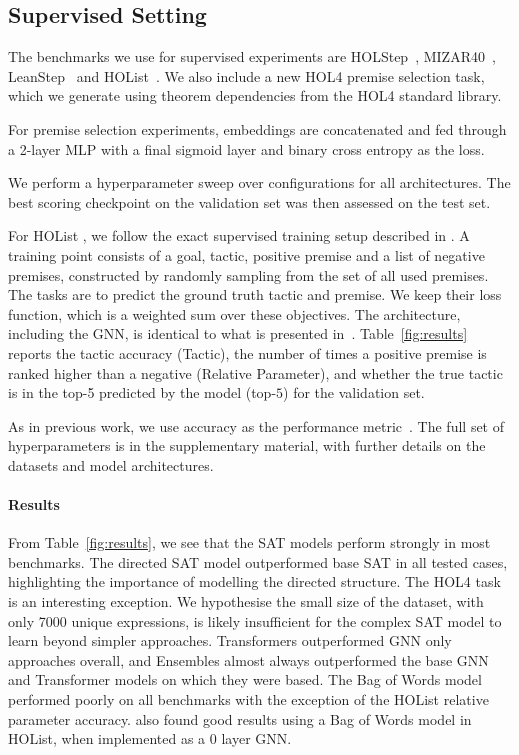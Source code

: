 \documentclass[letterpaper]{article} %
\newcommand\system[1]{#1}
\newcommand\dataset[1]{#1}
\begin{document}
    \subsection{Supervised Setting}
    The benchmarks we use for supervised experiments are HOLStep~\cite{kaliszyk_holstep_2017}, MIZAR40~\cite{kaliszyk_mizar_2015}, LeanStep~\cite{han_proof_2021} and HOList~\cite{bansal_holist_2019}. We also include a new HOL4 premise selection task, which we generate using theorem dependencies from the HOL4 standard library.

    For premise selection experiments,
    embeddings are concatenated and fed through a 2-layer MLP
    with a final sigmoid layer and binary cross entropy as the loss.

    We perform a hyperparameter sweep over configurations for all architectures. The best scoring checkpoint on the validation set was then assessed on the test set.

    For \dataset{HOList} \cite{bansal_holist_2019}, we follow the exact supervised training setup described in \cite{paliwal_graph_2020}.
    A training point consists of a goal, tactic, positive premise and a list of negative premises, constructed by randomly sampling from the set of all used premises.
    The tasks are to predict the ground truth tactic and premise.
    We keep their loss function, which is a weighted sum over these objectives.
    The architecture, including the GNN, is identical to what is presented in~\cite{paliwal_graph_2020}.
    Table~\ref{fig:results} reports the tactic accuracy (Tactic), the number of times a positive premise is ranked higher than a negative (Relative Parameter), and whether the true tactic is in the top-5 predicted by the model (top-$5$) for the validation set.

    As in previous work, we use accuracy as the performance metric~\cite{paliwal_graph_2020, wang_premise_2017}.
    The full set of hyperparameters is in the supplementary material, with further details on the datasets and model architectures.

    \paragraph{Results}
    From Table~\ref{fig:results}, we see that the SAT models perform strongly in most benchmarks. The directed SAT model outperformed base SAT in all tested cases, highlighting the importance of modelling the directed structure. The \system{HOL4} task is an interesting exception.
    We hypothesise the small size of the dataset, with only 7000 unique expressions, is likely insufficient for the complex SAT model to learn beyond simpler approaches.
    Transformers outperformed GNN only approaches overall, and Ensembles almost always outperformed the base GNN and Transformer models on which they were based.
    The Bag of Words model performed poorly on all benchmarks with the exception of the \dataset{HOList} relative parameter accuracy.
    \cite{paliwal_graph_2020} also found good results using a Bag of Words model in \dataset{HOList}, when implemented as a 0 layer GNN.
\end{document}
